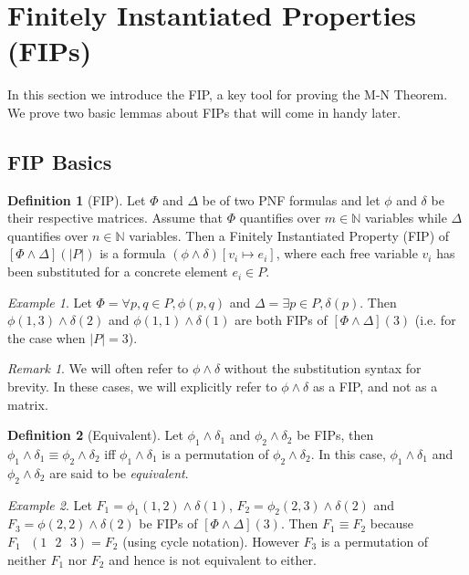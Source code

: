 \documentclass[12pt]{article}
\theoremstyle{definition}
\newtheorem{definition}{Definition}
\theoremstyle{remark}
\newtheorem{example}{Example}
\newtheorem{remark}{Remark}
\newcommand{\msp}{\text{ }}
\begin{document}
\section{Finitely Instantiated Properties (FIPs)}
In this section we introduce the FIP, a key tool for proving the M-N Theorem.  We prove two basic lemmas about FIPs that will come in handy later.

\subsection{FIP Basics}

\begin{definition}[FIP]
  Let $\Phi$ and $\Delta$ be of two PNF formulas and let $\phi$ and $\delta$ be their respective matrices.  Assume that $\Phi$ quantifies over $m \in \mathbb{N}$ variables while $\Delta$ quantifies over $n \in \mathbb{N}$ variables.  Then a Finitely Instantiated Property (FIP) of $[\Phi\land\Delta](|P|)$ is a formula $(\phi \land \delta) [v_i \mapsto e_i]$, where each free variable $v_i$ has been substituted for a concrete element $e_i \in P$.  
\end{definition}

\begin{example}
  Let $\Phi = \forall p,q \in P, \phi(p,q)$ and $\Delta = \exists p \in P, \delta(p)$.  Then $\phi(1,3)\land\delta(2)$ and $\phi(1,1)\land\delta(1)$ are both FIPs of $[\Phi\land\Delta](3)$ (i.e. for the case when $|P|=3$).
\end{example}

\begin{remark}
  We will often refer to $\phi\land\delta$ without the substitution syntax for brevity.  In these cases, we will explicitly refer to $\phi\land\delta$ as a FIP, and not as a matrix.
\end{remark}

\begin{definition}[Equivalent]
  Let $\phi_1\land\delta_1$ and $\phi_2\land\delta_2$ be FIPs, then $\phi_1\land\delta_1 \equiv \phi_2\land\delta_2$ iff $\phi_1\land\delta_1$ is a permutation of $\phi_2\land\delta_2$.  In this case, $\phi_1\land\delta_1$ and $\phi_2\land\delta_2$ are said to be \textit{equivalent}.
\end{definition}

\begin{example}
  Let $F_1 = \phi_1(1,2) \land \delta(1)$, $F_2 = \phi_2(2,3) \land \delta(2)$ and $F_3 = \phi(2,2) \land \delta(2)$ be FIPs of $[\Phi\land\Delta](3)$.  Then $F_1 \equiv F_2$ because $F_1 \msp (1 \msp 2 \msp 3) = F_2$ (using cycle notation).  However $F_3$ is a permutation of neither $F_1$ nor $F_2$ and hence is not equivalent to either.
\end{example}
\end{document}

